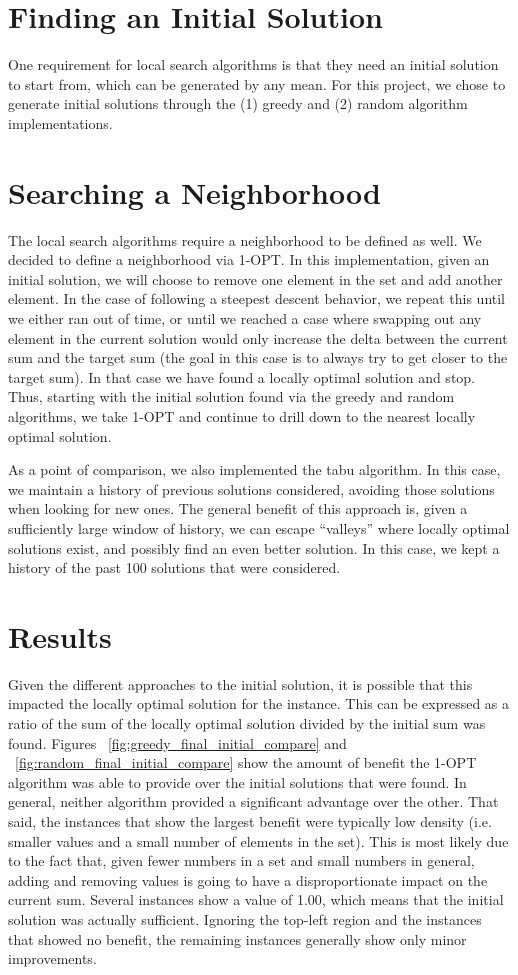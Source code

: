 \documentclass{report}
\begin{document}
\section{Finding an Initial Solution}
One requirement for local search algorithms is that they need an initial solution to start from, which
can be generated by any mean. For this project, we chose to generate initial
solutions through the (1) greedy and (2) random algorithm implementations.

\section{Searching a Neighborhood}
The local search algorithms require a neighborhood to be defined as well. We decided to define a neighborhood
via 1-OPT. In this implementation, given an initial solution, we will choose to remove one element in the set
and add another element. In the case of following a steepest descent behavior, we repeat this until we
either ran out of time, or until we reached a case where swapping out any element in the current solution
would only increase the delta between the current sum and the target sum (the goal in this case is to always try to
get closer to the target sum). In that case we have found a locally
optimal solution and stop. Thus, starting with the initial solution found via the greedy and random
algorithms, we take 1-OPT and continue to drill down to the nearest locally optimal solution.

As a point of comparison, we also implemented the tabu algorithm. In this case, we maintain a history
of previous solutions considered, avoiding those solutions when looking for new ones. The general
benefit of this approach is, given a sufficiently large window of history, we can escape ``valleys''
where locally optimal solutions exist, and possibly find an even better solution. In this case,
we kept a history of the past 100 solutions that were considered.

\section{Results}
Given the different approaches to the initial solution, it is possible that this impacted
the locally optimal solution for the instance. This can be expressed as a ratio of the sum of
the locally optimal solution divided by the initial sum was found. Figures ~\ref{fig:greedy_final_initial_compare} and
~\ref{fig:random_final_initial_compare} show the amount of benefit the 1-OPT algorithm was able to
provide over the initial solutions that were found. In general, neither algorithm provided a significant advantage over
the other. That said, the instances that show the largest benefit were typically low density (i.e. smaller values
and a small number of elements in the set). This is most likely due to the fact that, given fewer numbers in a set and small
numbers in general, adding and removing values is going to have a disproportionate impact on the current sum. Several instances
show a value of 1.00, which means that the initial solution was actually sufficient. Ignoring the top-left region and the instances
that showed no benefit, the remaining instances generally show only minor improvements.
\end{document}
